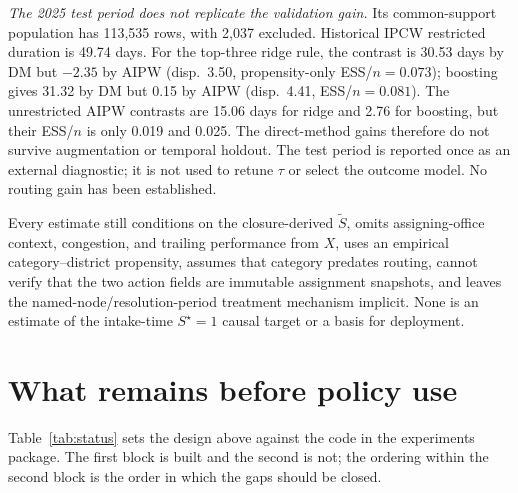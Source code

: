 \documentclass[11pt,a4paper]{article}
\theoremstyle{plain}
\theoremstyle{definition}
\theoremstyle{remark}
\newcommand{\Sstar}{S^{\star}}
\newcommand{\Sproxy}{\widetilde S}
\begin{document}
\emph{The 2025 test period does not replicate the validation gain.} Its common-support population
has 113,535 rows, with 2,037 excluded. Historical IPCW restricted duration is 49.74 days. For
the top-three ridge rule, the contrast is 30.53 days by DM but $-2.35$ by AIPW (disp.\ 3.50,
propensity-only ESS/$n=0.073$); boosting gives 31.32 by DM but 0.15 by AIPW (disp.\ 4.41,
ESS/$n=0.081$). The unrestricted AIPW contrasts are 15.06 days for ridge and 2.76 for boosting,
but their ESS/$n$ is only 0.019 and 0.025. The direct-method gains therefore do not survive
augmentation or temporal holdout. The test period is reported once as an external diagnostic;
it is not used to retune $\tau$ or select the outcome model. No routing gain has been established.

Every estimate still conditions on the closure-derived $\Sproxy$, omits assigning-office
context, congestion, and trailing performance from $X$, uses an empirical category--district
propensity, assumes that category predates routing, cannot verify that the two action fields are
immutable assignment snapshots, and leaves the named-node/resolution-period treatment mechanism implicit.
None is an estimate of the intake-time $\Sstar=1$ causal target or a basis for deployment.

\section{What remains before policy use}\label{sec:status}

Table~\ref{tab:status} sets the design above against the code in the experiments package. The
first block is built and the second is not; the ordering within the second block is the order in
which the gaps should be closed.
\end{document}
